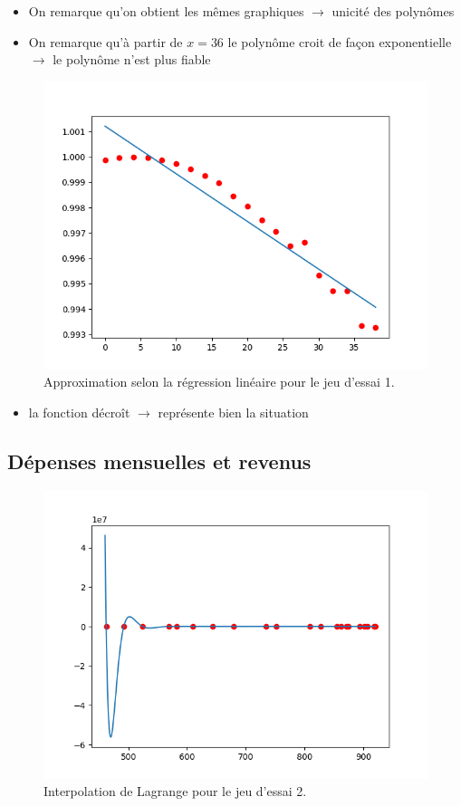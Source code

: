 \documentclass[12pt,french,titlepage]{article}
\begin{document}
		\begin{itemize}
			\item On remarque qu'on obtient les mêmes graphiques $\rightarrow$ unicité des polynômes
			\item On remarque qu'à partir de $x=36$ le polynôme croit de façon exponentielle $\rightarrow$ le polynôme n'est plus fiable
		\end{itemize}
		
		\begin{figure}[H]
		\includegraphics[width=\textwidth]{"13.png"}
		\caption{Approximation selon la régression linéaire pour le jeu d'essai 1.}
		\end{figure}
	
		\begin{itemize}
			\item la fonction décroît $\rightarrow$ représente bien la situation
		\end{itemize}

	\subsection{Dépenses mensuelles et revenus}
		\begin{figure}[H]
		\includegraphics[width=\textwidth]{"21.png"}
		\caption{Interpolation de Lagrange pour le jeu d'essai 2.}
		\end{figure}
		
\end{document}
